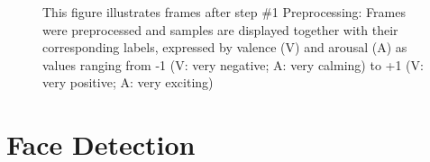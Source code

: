\begin{figure}[htbp]
  \hfill
  \caption[ER pipeline step \#1: Preprocessing]{This figure illustrates frames after step \#1 Preprocessing: Frames were preprocessed and samples are displayed together with their corresponding labels, expressed by valence (V) and arousal (A) as values ranging from -1 (V: very negative; A: very calming) to +1 (V: very positive; A: very exciting)}
  \label{fig:MethodologyPreprocess}
\end{figure}


\section{Face Detection} \label{sec:FaceDetection}

